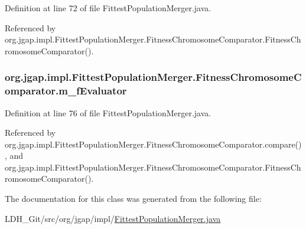 Definition at line 72 of file Fittest\-Population\-Merger.\-java.



Referenced by org.\-jgap.\-impl.\-Fittest\-Population\-Merger.\-Fitness\-Chromosome\-Comparator.\-Fitness\-Chromosome\-Comparator().

\hypertarget{classorg_1_1jgap_1_1impl_1_1_fittest_population_merger_1_1_fitness_chromosome_comparator_a838ea1ddebe662371b8e23855368e999}{
\subsubsection[{m\-\_\-f\-Evaluator}]{ org.\-jgap.\-impl.\-Fittest\-Population\-Merger.\-Fitness\-Chromosome\-Comparator.\-m\-\_\-f\-Evaluator\hspace{0.3cm}{\ttfamily [private]}}}\label{classorg_1_1jgap_1_1impl_1_1_fittest_population_merger_1_1_fitness_chromosome_comparator_a838ea1ddebe662371b8e23855368e999}


Definition at line 76 of file Fittest\-Population\-Merger.\-java.



Referenced by org.\-jgap.\-impl.\-Fittest\-Population\-Merger.\-Fitness\-Chromosome\-Comparator.\-compare(), and org.\-jgap.\-impl.\-Fittest\-Population\-Merger.\-Fitness\-Chromosome\-Comparator.\-Fitness\-Chromosome\-Comparator().



The documentation for this class was generated from the following file\-:\begin{DoxyCompactItemize}
\item 
L\-D\-H\-\_\-\-Git/src/org/jgap/impl/\hyperlink{_fittest_population_merger_8java}{Fittest\-Population\-Merger.\-java}\end{DoxyCompactItemize}

